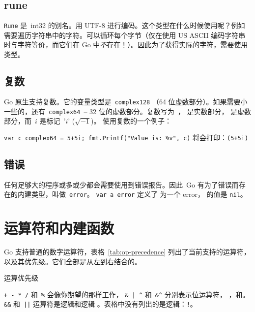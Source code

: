 \subsection{rune}
\lstinline{Rune} 是~int32 的别名。用 UTF-8 进行编码。这个类型在什么时候使用呢？例如需要遍历字符串中的字符。可以循环每个字节（仅在使用 US ASCII 编码字符串时与字符等价，而它们在 Go 中\emph{不}存在！）。因此为了获得实际的字符，需要使用  类型。

\subsection{复数}
Go 原生支持复数。它的变量类型是~\lstinline{complex128}
（64 位虚数部分）。如果需要小一些的，还有~\lstinline{complex64}~-- 
32 位的虚数部分。复数写为~， 是实数部分，
 是虚数部分，而~$i$ 是标记~'$i$' ($\sqrt{-1}$)。
使用复数的一个例子：

\lstinline{var c complex64 = 5+5i; fmt.Printf("Value is: %v", c)}\newline
将会打印：\lstinline{(5+5i)}

\subsection{错误}
任何足够大的程序或多或少都会需要使用到错误报告。因此~Go 有为了错误而存在的内建类型，叫做~\lstinline{error}。
\lstinline{var a error}
定义了  为一个 error， 的值是 \lstinline{nil}。

\section{运算符和内建函数}
\label{sec:builtins}
Go 支持普通的数字运算符，表格~\ref{tab:op-precedence} 列出了当前支持的运算符，
以及其优先级。它们全部是从左到右结合的。

\begin{table}[H]
\begin{center}
\caption{运算优先级}
\label{tab:op-precedence}

\end{center}
\end{table}
\verb|+ - * /| 和~\verb|%| 会像你期望的那样工作，
\verb!& | ^! 和~\verb!&^! 分别表示位运算符，
，和。
\verb|&&| 和~\verb/||/ 运算符是逻辑和逻辑
。表格中没有列出的是逻辑：\verb/!/。

